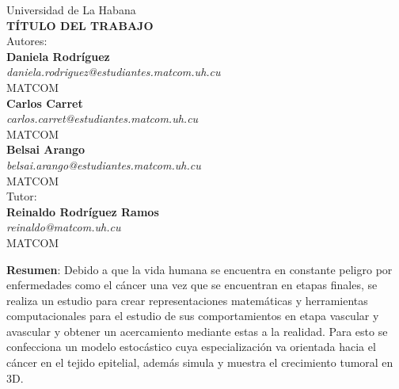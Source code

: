 \documentclass[12pt]{amsart}
\begin{document}
\begin{center}
    {\large Universidad de La Habana}  \\ 
    \vskip 0.1cm
    {\LARGE \textbf{T\'ITULO DEL TRABAJO}} \\
    \vskip 2cm
    {\Large Autores:}\\ 
    \vspace{0.5cm} 
            {\Large\textbf{Daniela Rodr\'iguez}} \\
    		{\normalsize\textit{daniela.rodriguez@estudiantes.matcom.uh.cu}}\\
    		MATCOM\\
			\smallskip
    		{\Large\textbf{Carlos Carret}} \\
    		{\normalsize\textit{carlos.carret@estudiantes.matcom.uh.cu}}\\
			MATCOM\\
			\smallskip
 			{\Large\textbf{Belsai Arango}} \\
 			{\normalsize\textit{belsai.arango@estudiantes.matcom.uh.cu}}\\
 			MATCOM \\
 \smallskip
 \smallskip
    {\Large Tutor:\\ 
    \vspace{0.05cm} 
    		\textbf{Reinaldo Rodr\'iguez Ramos}} \\ 
    		\textit{reinaldo@matcom.uh.cu}\\
    		MATCOM \\   
  \vskip 1.5cm
  
  \Large \textbf{Resumen}:
  Debido a que la vida humana se encuentra en constante peligro por enfermedades como el c\'ancer una vez que se encuentran en etapas finales, se realiza un estudio para crear representaciones matem\'aticas y herramientas computacionales para el estudio de sus comportamientos en etapa vascular y avascular y obtener un acercamiento mediante estas a la realidad. Para esto se confecciona un modelo estoc\'astico cuya especializaci\'on va orientada hacia el c\'ancer en el tejido epitelial, adem\'as simula y muestra el crecimiento tumoral en 3D.
    
  \end{center}
  
\newpage
\end{document}
